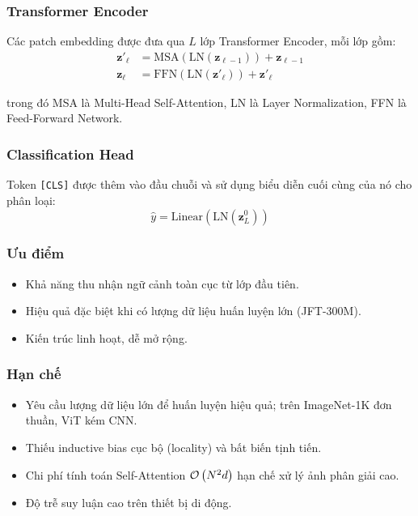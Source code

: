 \subsubsection*{Transformer Encoder}

Các patch embedding được đưa qua $L$ lớp Transformer Encoder, mỗi lớp gồm:
\begin{align}
    \mathbf{z}'_\ell &= \text{MSA}(\text{LN}(\mathbf{z}_{\ell-1})) + \mathbf{z}_{\ell-1} \\
    \mathbf{z}_\ell &= \text{FFN}(\text{LN}(\mathbf{z}'_\ell)) + \mathbf{z}'_\ell
\end{align}

\noindent trong đó MSA là Multi-Head Self-Attention, LN là Layer Normalization, FFN là Feed-Forward Network.

\subsubsection*{Classification Head}

Token \texttt{[CLS]} được thêm vào đầu chuỗi và sử dụng biểu diễn cuối cùng của nó cho phân loại:
\begin{equation}
    \hat{y} = \text{Linear}(\text{LN}(\mathbf{z}_L^0))
\end{equation}

\subsubsection*{Ưu điểm}
\begin{itemize}
    \item Khả năng thu nhận ngữ cảnh toàn cục từ lớp đầu tiên.
    \item Hiệu quả đặc biệt khi có lượng dữ liệu huấn luyện lớn (JFT-300M).
    \item Kiến trúc linh hoạt, dễ mở rộng.
\end{itemize}

\subsubsection*{Hạn chế}
\begin{itemize}
    \item Yêu cầu lượng dữ liệu lớn để huấn luyện hiệu quả; trên ImageNet-1K đơn thuần, ViT kém CNN.
    \item Thiếu inductive bias cục bộ (locality) và bất biến tịnh tiến.
    \item Chi phí tính toán Self-Attention $\mathcal{O}\left(N^2 d\right)$ hạn chế xử lý ảnh phân giải cao.
    \item Độ trễ suy luận cao trên thiết bị di động.
\end{itemize}

